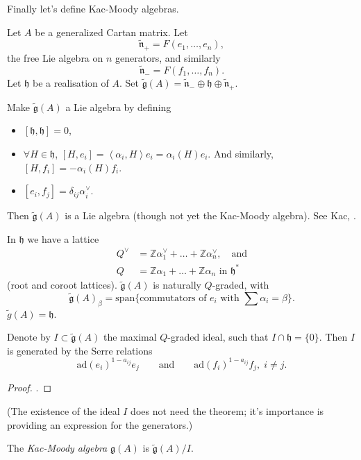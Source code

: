 \medskip\noindent
Finally let's define Kac-Moody algebras.

Let $A$ be a generalized Cartan matrix. Let 
$$
\tilde{\mathfrak{n}}_+=F(e_1,\ldots,e_n),
$$ 
the free Lie algebra on $n$ generators, and similarly
$$
\tilde{\mathfrak{n}}_-=F(f_1,\ldots,f_n).
$$
Let $\mathfrak{h}$ be a realisation of $A$. 
Set $\tilde{\mathfrak{g}}(A)
=\tilde{\mathfrak{n}}_- \oplus \mathfrak{h} \oplus \tilde{\mathfrak{n}}_+$.

Make $\tilde{\mathfrak{g}}(A)$ a Lie algebra by defining
\begin{itemize}
\item $[\mathfrak{h},\mathfrak{h}]=0$,
\item $\forall  H \in \mathfrak{h}$, $[H,e_i]=\left<\alpha_i,H\right>e_i
=\alpha_i(H)e_i$. And similarly, $[H,f_i]=-\alpha_i(H)f_i$.
\item $[e_i,f_j]=\delta_{ij}\alpha_i^\vee$.
\end{itemize}
Then $\tilde{\mathfrak{g}}(A)$ is a Lie algebra (though not yet the Kac-Moody
algebra). See Kac, \cite[Thorem 1.2]{IDLA}.

\begin{remark}
\label{remark-lattice}
In $\mathfrak{h}$ we have a lattice
\begin{align*}
Q^\vee&=\mathbb{Z}\alpha_1^\vee+\ldots+\mathbb{Z}\alpha_n^\vee,\quad
\text{and}\\
Q&=\mathbb{Z}\alpha_1+\ldots+\mathbb{Z}\alpha_n\text{ in }\mathfrak{h}^*
\end{align*}
(root and coroot lattices). $\tilde{\mathfrak{g}}(A)$ is naturally $Q$-graded,
with 
$$
\tilde{\mathfrak{g}}(A)_\beta=\text{span}\{
\text{commutators of $e_i$ with $\sum \alpha_i=\beta$}\}.
$$
$\tilde{g}(A)=\mathfrak{h}$.

\begin{theorem}
\label{theorem-Gabber-Kac}
Denote by $I \subset \tilde{\mathfrak{g}}(A)$ the maximal $Q$-graded ideal, such
that $I \cap\mathfrak{h}=\{0\}$. 
Then $I$ is generated by the Serre relations 
$$
\text{ad}(e_i)^{1-a_{ij}}e_j\qquad \text{and}\qquad 
\text{ad}(f_i)^{1-a_{ij}}f_j,\; i\neq j.
$$
\end{theorem}

\begin{proof}
\cite[Theorem 9.11]{IDLA}.
\end{proof}

(The existence of the ideal $I$ does not need the theorem; 
it's importance is providing an
expression for the generators.)

\begin{definition}
\label{definition-Kac-Moody-algebra}
The {\it Kac-Moody algebra} $\mathfrak{g}(A)$ is $\tilde{\mathfrak{g}}(A)/I$.
\end{definition}

\end{remark}







